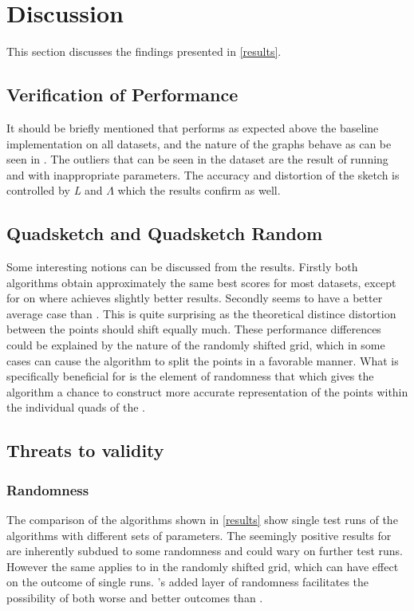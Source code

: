 \section{Discussion}
\label{discussion}
This section discusses the findings presented in \ref{results}.

\subsection{Verification of Performance}
It should be briefly mentioned that \qs{} performs as expected above the baseline \grid{} implementation on all datasets, and the nature of the graphs behave as can be seen in \cite{wagner17}. The outliers that can be seen in the dataset are the result of running \qs{} and \qsr{} with inappropriate parameters. The accuracy and distortion of the sketch is controlled by \textit{L} and $\Lambda$ which the results confirm as well. 

\subsection{Quadsketch and Quadsketch Random}
Some interesting notions can be discussed from the results. Firstly both algorithms obtain approximately the same best scores for most datasets, except for on \mnist{} where \qsr{} achieves slightly better results. 
Secondly \qsr{} seems to have a better average case than \qs{}. This is quite surprising as the theoretical distince distortion between the points should shift equally much. These performance differences could be explained by the nature of the randomly shifted grid, which in some cases can cause the algorithm to split the points in a favorable manner. What is  specifically beneficial for \qsr{} is the element of randomness that which gives the algorithm a chance to construct more accurate representation of the points within the individual quads of the \qt{}.


\subsection{Threats to validity}

\subsubsection{Randomness}
\label{disc/threats/randomness}
The comparison of the algorithms shown in \ref{results} show single test runs of the algorithms with different sets of parameters. The seemingly positive results for \qsr{} are inherently subdued to some randomness and could wary on further test runs. However the same applies to \qs{} in the randomly shifted grid, which can have effect on the outcome of single runs. \qsr{}'s added layer of randomness facilitates the possibility of both worse and better outcomes than \qs{}.

